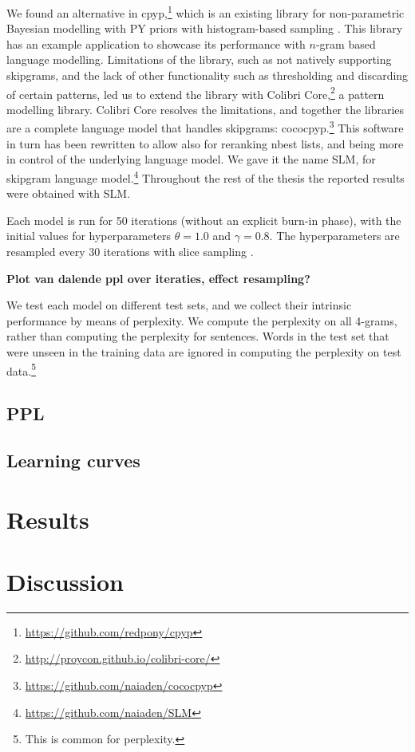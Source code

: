 We found an alternative in cpyp,\footnote{\url{https://github.com/redpony/cpyp}} which is an existing library for non-parametric Bayesian modelling with PY priors with histogram-based sampling \cite{blunsom2009note}. This library has an example application to showcase its performance with $n$-gram based language modelling. Limitations of the library, such as not natively supporting skipgrams, and the lack of other functionality such as thresholding and discarding of certain patterns, led us to extend the library with Colibri Core,\footnote{\url{http://proycon.github.io/colibri-core/}} a pattern modelling library. Colibri Core resolves the limitations, and together the libraries are a complete language model that handles skipgrams: cococpyp.\footnote{\url{https://github.com/naiaden/cococpyp}} This software in turn has been rewritten to allow also for reranking nbest lists, and being more in control of the underlying language model. We gave it the name SLM, for skipgram language model.\footnote{\url{https://github.com/naiaden/SLM}} Throughout the rest of the thesis the reported results were obtained with SLM.

  Each model is run for 50 iterations (without an explicit burn-in phase), with the initial values for hyperparameters $\theta=1.0$ and $\gamma=0.8$. The hyperparameters are resampled every 30 iterations with slice sampling \cite{walker2007sampling}.
  
  \textbf{Plot van dalende ppl over iteraties, effect resampling?}
  
  We test each model on different test sets, and we collect their intrinsic performance by means of perplexity. We compute the perplexity on all 4-grams, rather than computing the perplexity for sentences. 
  Words in the test set that were unseen in the training data are ignored in computing the perplexity on test data.\footnote{This is common for perplexity. } 

\subsection{PPL}
\subsection{Learning curves}

\section{Results}

\section{Discussion}
